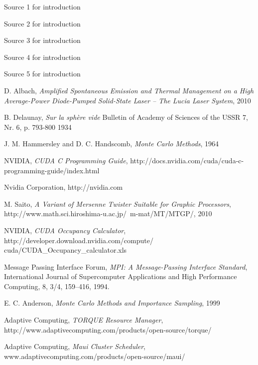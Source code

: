 \begin{thebibliography}{9}

    Source 1 for introduction

    Source 2 for introduction

    Source 3 for introduction

    Source 4 for introduction

    Source 5 for introduction

    D. Albach,
    \emph{Amplified Spontaneous Emission and Thermal Management on a High Average-Power Diode-Pumped Solid-State Laser \--- The Lucia Laser System},
    2010

    B. Delaunay,
    \emph{Sur la sphère vide}
    Bulletin of Academy of Sciences of the USSR 7,
    Nr. 6,
    p. 793-800
    1934

    J. M. Hammersley and D. C. Handscomb,
    \emph{Monte Carlo Methods},
    1964

    NVIDIA,
    \emph{CUDA C Programming Guide},
    http://docs.nvidia.com/cuda/cuda-c-programming-guide/index.html

    Nvidia Corporation,
    http://nvidia.com

    M. Saito,
    \emph{A Variant of Mersenne Twister Suitable for Graphic Processors},
    http://www.math.sci.hiroshima-u.ac.jp/~m-mat/MT/MTGP/,
    2010

    NVIDIA,
    \emph{CUDA Occupancy Calculator},
    http://developer.download.nvidia.com/compute/ cuda/CUDA\_Occupancy\_calculator.xls

    Message Passing Interface Forum,
    \emph{MPI: A Message-Passing Interface Standard}, 
    International Journal of Supercomputer Applications and High Performance Computing,
    8, 3/4, 159–416, 1994.

    E. C. Anderson,
    \emph{Monte Carlo Methods and Importance Sampling},
    1999

    Adaptive Computing,
    \emph{TORQUE Resource Manager},
    http://www.adaptivecomputing.com/products/open-source/torque/

    Adaptive Computing,
    \emph{Maui Cluster Scheduler},
    www.adaptivecomputing.com/products/open-source/maui/




\end{thebibliography}
